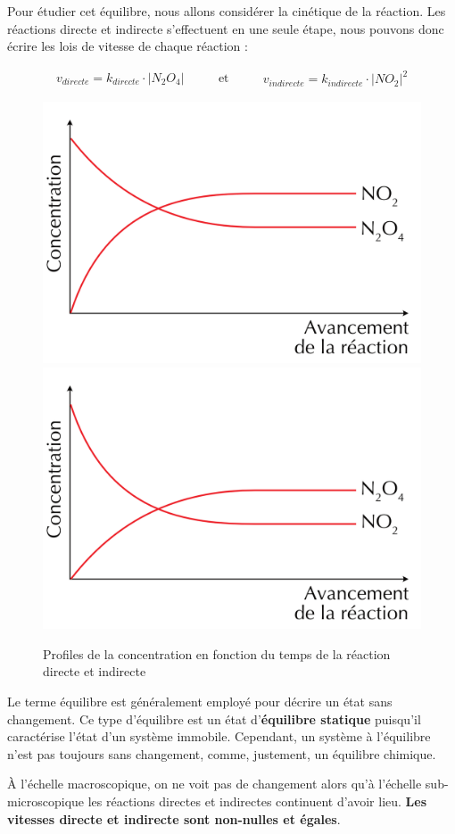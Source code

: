 \documentclass[
  11pt,
  a4paper,
  openany]{book}
\begin{document}
Pour étudier cet équilibre, nous allons considérer la cinétique de la réaction. Les réactions directe et indirecte s'effectuent en une seule étape, nous pouvons donc écrire les lois de vitesse de chaque réaction :

\[
\begin{split}
  v_{directe} = k_{directe} \cdot |N_2O_4|
\end{split}
\qquad
\text{ et }
\qquad
\begin{split}
  v_{indirecte} = k_{indirecte} \cdot |NO_2|^2
\end{split}
\]

\begin{figure}

{\centering \includegraphics[width=0.33\linewidth]{images/equilibres-concentrations-1a} \includegraphics[width=0.33\linewidth]{images/equilibres-concentrations-1b} 

}

\caption{Profiles de la concentration en fonction du temps de la réaction directe et indirecte}\label{fig:equilibres-concentrations-1}
\end{figure}

Le terme équilibre est généralement employé pour décrire un état sans changement. Ce type d'équilibre est un état d'\textbf{équilibre statique} puisqu'il caractérise l'état d'un système immobile. Cependant, un système à l'équilibre n'est pas toujours sans changement, comme, justement, un équilibre chimique.

À l'échelle macroscopique, on ne voit pas de changement alors qu'à l'échelle sub-microscopique les réactions directes et indirectes continuent d'avoir lieu. \textbf{Les vitesses directe et indirecte sont non-nulles et égales}.
\end{document}
